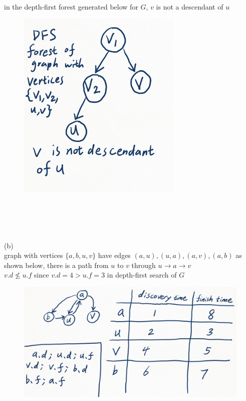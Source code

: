 \documentclass[12pt,border=4pt,multi]{article} %
\begin{document}
\\
in the depth-first forest generated below for $G$, $v$ is not a descendant of $u$
\begin{figure}[h!]
	\centering
	\includegraphics[width=0.7\textwidth, height=0.75\textwidth]{3a2} %
\end{figure}
\newpage
\noindent
\\
\\
\\
\\
(b)\\
graph with vertices $\{a, b, u, v\}$ have edges $(a, u), (u, a), (a, v), (a, b)$ as shown below, there is a path from $u$ to $v$ through $u \rightarrow a \rightarrow v$\\
$v.d \not\leq u.f$ since $v.d = 4 > u.f = 3$ in depth-first search of $G$\\
\begin{figure}[h!]
	\centering
	\includegraphics[width=1.1\textwidth, height=0.65\textwidth]{3b} %
\end{figure}
\end{document}
